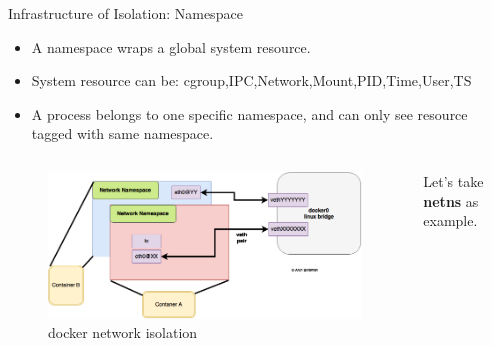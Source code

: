 \begin{frame}{Infrastructure of Isolation: Namespace }
    \begin{itemize}
        \item A namespace wraps a global system resource.
        \pause
        \item System resource can be: cgroup,IPC,Network,Mount,PID,Time,User,TS
        \pause
        \item A process belongs to one specific namespace, and can only see resource tagged with same namespace.
    \end{itemize}
    \pause
    \begin{columns}
        \begin{column}{0.7\textwidth}
            \begin{figure}
                \includegraphics[width=1\textwidth]{assets/network.png}
                \caption{docker network isolation }
            \end{figure}
        \end{column}
        \begin{column}{0.3\textwidth}
            Let's take \textbf{netns} as example.
        \end{column}
    \end{columns}
\end{frame}